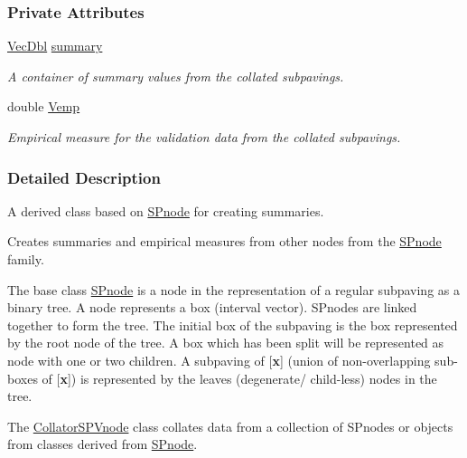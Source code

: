 \subsubsection*{\-Private \-Attributes}
\begin{DoxyCompactItemize}
\item 
\hyperlink{namespacesubpavings_a6b4d2e61b2f0b65cacc9c9322d89bc37}{\-Vec\-Dbl} \hyperlink{classsubpavings_1_1CollatorSPVnode_ad85d48d6c14888cc7d375f74b63c2f92}{summary}
\begin{DoxyCompactList}\small\item\em \-A container of summary values from the collated subpavings. \end{DoxyCompactList}\item 
double \hyperlink{classsubpavings_1_1CollatorSPVnode_a31cd9926485cf1190effb77a9ce8dac4}{\-Vemp}
\begin{DoxyCompactList}\small\item\em \-Empirical measure for the validation data from the collated subpavings. \end{DoxyCompactList}\end{DoxyCompactItemize}


\subsubsection{\-Detailed \-Description}
\-A derived class based on \hyperlink{classsubpavings_1_1SPnode}{\-S\-Pnode} for creating summaries. 

\-Creates summaries and empirical measures from other nodes from the \hyperlink{classsubpavings_1_1SPnode}{\-S\-Pnode} family.

\-The base class \hyperlink{classsubpavings_1_1SPnode}{\-S\-Pnode} is a node in the representation of a regular subpaving as a binary tree. \-A node represents a box (interval vector). \-S\-Pnodes are linked together to form the tree. \-The initial box of the subpaving is the box represented by the root node of the tree. \-A box which has been split will be represented as node with one or two children. \-A subpaving of \mbox{[}{\bfseries x}\mbox{]} (union of non-\/overlapping sub-\/ boxes of \mbox{[}{\bfseries x}\mbox{]}) is represented by the leaves (degenerate/ child-\/less) nodes in the tree.

\-The \hyperlink{classsubpavings_1_1CollatorSPVnode}{\-Collator\-S\-P\-Vnode} class collates data from a collection of \-S\-Pnodes or objects from classes derived from \hyperlink{classsubpavings_1_1SPnode}{\-S\-Pnode}.


